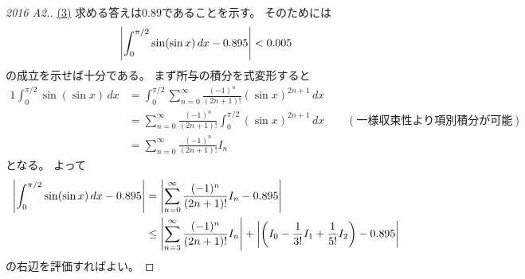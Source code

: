 \documentclass[report]{jlreq}
\begin{document}
\begin{proof}[2016 A2.]
    \uline{(3)} \quad
    求める答えは$0.89$であることを示す。
    そのためには
    \begin{equation}
        \left|{
            \int_0^{\pi / 2}
                \sin (\sin x) \, dx
            - 0.895
        }\right|
            < 0.005
    \end{equation}
    の成立を示せば十分である。
    まず所与の積分を式変形すると
    \begin{alignat}{1}
        \int_0^{\pi / 2} \sin (\sin x) \, dx
            &=
                \int_0^{\pi / 2}
                    \sum_{n = 0}^\infty
                        \frac{(-1)^n}{(2n + 1)!} (\sin x)^{2n + 1}
                    \, dx
                \\
            &=
                \sum_{n = 0}^\infty
                    \frac{(-1)^n}{(2n + 1)!}
                    \int_0^{\pi / 2} (\sin x)^{2n + 1}
                    \, dx
                \qquad
                (\text{一様収束性より項別積分が可能})
                \\
            &=
                \sum_{n = 0}^\infty
                    \frac{(-1)^n}{(2n + 1)!}
                    I_n
    \end{alignat}
    となる。
    よって
    \begin{alignat}{1}
        \myabs{
            \int_0^{\pi / 2}
                \sin (\sin x) \, dx
            -
            0.895
        }
            &=
                \myabs{
                    \sum_{n = 0}^\infty
                        \frac{(-1)^n}{(2n + 1)!}
                        I_n
                    -
                    0.895
                }
                \\
            &\le
                \myabs{
                    \sum_{n = 3}^\infty
                        \frac{(-1)^n}{(2n + 1)!}
                        I_n
                }
                +
                \myabs{
                    \myparen{
                        I_0 - \frac{1}{3!} I_1 + \frac{1}{5!} I_2
                    }
                    -
                    0.895
                }
                \locallabel{eq:1}
    \end{alignat}
    の右辺を評価すればよい。


\end{proof}
\end{document}
